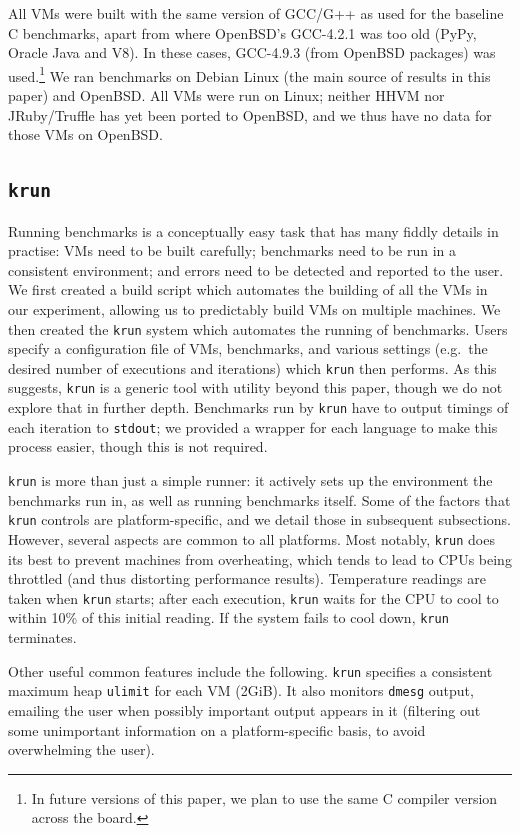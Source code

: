 \documentclass[10pt,preprint]{sigplanconf}
\newcommand{\krun}{\texttt{krun}\xspace}
\begin{document}
All VMs were built with the same version of GCC/G++ as used for the baseline C
benchmarks, apart from where OpenBSD's GCC-4.2.1 was too old (PyPy, Oracle Java
and V8). In these cases, GCC-4.9.3 (from OpenBSD packages) was used.\footnote{In
future versions of this paper, we plan to use the same C compiler version
across the board.} We ran benchmarks on Debian Linux (the main source of
results in this paper) and
OpenBSD. All VMs were run on Linux; neither HHVM nor JRuby/Truffle has yet been
ported to OpenBSD, and we thus have no data for those VMs on OpenBSD.


\subsection{\krun}

Running benchmarks is a conceptually easy task that has many fiddly details in
practise: VMs need to be built carefully; benchmarks need to be run in a consistent
environment; and errors need to be detected and reported to the user. We first created
a build script which automates the building of all the VMs in our experiment, allowing
us to predictably build VMs on multiple machines. We
then created the \krun system which automates the running of benchmarks. Users specify a configuration file of VMs, benchmarks, and various settings (e.g.~the desired number of executions and iterations) which \krun then performs. As this suggests, \krun is a generic tool with utility beyond this paper, though we do not explore that in further depth. Benchmarks run by \krun have to output timings of each iteration to \texttt{stdout}; we provided a wrapper for each language to make this process easier, though this is not required.

\krun is more than just a simple runner: it actively sets up the environment the
benchmarks run in, as well as running benchmarks itself. Some of the factors
that \krun controls are platform-specific, and we detail
those in subsequent subsections. However, several aspects are common to all
platforms. Most notably, \krun does its best to prevent machines from
overheating, which tends to lead to CPUs being throttled (and thus distorting
performance results). Temperature readings are taken when \krun starts; after
each execution, \krun waits for the CPU to cool to within 10\%{} of this initial
reading. If the system fails to cool down, \krun terminates.  

Other useful common features include the following. \krun specifies a consistent maximum heap
\texttt{ulimit} for each VM (2GiB). It also monitors \texttt{dmesg} output,
emailing the user when possibly important output appears in it (filtering out
some unimportant information on a platform-specific basis, to avoid overwhelming
the user). 
\end{document}
